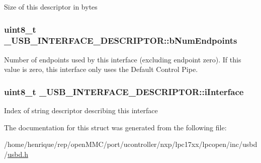 Size of this descriptor in bytes \hypertarget{struct__USB__INTERFACE__DESCRIPTOR_a9972081626557a77abd11258cc75684b}{
\subsubsection[{b\-Num\-Endpoints}]{\setlength{\rightskip}{0pt plus 5cm}uint8\-\_\-t \-\_\-\-U\-S\-B\-\_\-\-I\-N\-T\-E\-R\-F\-A\-C\-E\-\_\-\-D\-E\-S\-C\-R\-I\-P\-T\-O\-R\-::b\-Num\-Endpoints}}\label{struct__USB__INTERFACE__DESCRIPTOR_a9972081626557a77abd11258cc75684b}
Number of endpoints used by this interface (excluding endpoint zero). If this value is zero, this interface only uses the Default Control Pipe. \hypertarget{struct__USB__INTERFACE__DESCRIPTOR_a69b79c8ff54fe5c4ce9e0517923332a5}{
\subsubsection[{i\-Interface}]{\setlength{\rightskip}{0pt plus 5cm}uint8\-\_\-t \-\_\-\-U\-S\-B\-\_\-\-I\-N\-T\-E\-R\-F\-A\-C\-E\-\_\-\-D\-E\-S\-C\-R\-I\-P\-T\-O\-R\-::i\-Interface}}\label{struct__USB__INTERFACE__DESCRIPTOR_a69b79c8ff54fe5c4ce9e0517923332a5}
Index of string descriptor describing this interface 

The documentation for this struct was generated from the following file\-:\begin{DoxyCompactItemize}
\item 
/home/henrique/rep/open\-M\-M\-C/port/ucontroller/nxp/lpc17xx/lpcopen/inc/usbd/\hyperlink{usbd_8h}{usbd.\-h}\end{DoxyCompactItemize}
